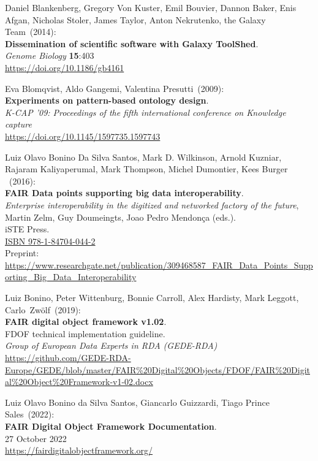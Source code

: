 \begin{thebibliography}{9}
Daniel Blankenberg, Gregory Von Kuster, Emil Bouvier, Dannon
Baker, Enis Afgan, Nicholas Stoler, James Taylor, Anton Nekrutenko, the
Galaxy Team~(2014): \\
\textbf{Dissemination of scientific software with Galaxy ToolShed}.\\
\emph{Genome Biology} \textbf{15}:403\\
\url{https://doi.org/10.1186/gb4161}

Eva Blomqvist, Aldo Gangemi, Valentina Presutti~(2009): \\
\textbf{Experiments on pattern-based ontology design}.\\
\emph{K-CAP '09: Proceedings of the fifth international conference on Knowledge capture}\\
\url{https://doi.org/10.1145/1597735.1597743}

Luiz Olavo Bonino Da Silva Santos, Mark D. Wilkinson, Arnold Kuzniar,
Rajaram Kaliyaperumal, Mark Thompson, Michel Dumontier, Kees Burger
~(2016): \\
\textbf{FAIR Data points supporting big data interoperability}. \\
\emph{Enterprise interoperability in the digitized and networked factory of the future}, Martin Zelm, Guy Doumeingts, Joao Pedro Mendonça (eds.).\\
iSTE Press. \\
\href{http://www.iste.co.uk/book.php?id=1073}{ISBN 978-1-84704-044-2} \\
Preprint: \url{https://www.researchgate.net/publication/309468587_FAIR_Data_Points_Supporting_Big_Data_Interoperability}

Luiz Bonino, Peter Wittenburg, Bonnie Carroll, Alex
Hardisty, Mark Leggott, Carlo~Zwölf~(2019): \\
\textbf{FAIR digital object framework v1.02}.\\
FDOF technical implementation guideline.\\
\emph{Group of European Data Experts in RDA (GEDE-RDA)}\\
\url{https://github.com/GEDE-RDA-Europe/GEDE/blob/master/FAIR\%20Digital\%20Objects/FDOF/FAIR\%20Digital\%20Object\%20Framework-v1-02.docx}

Luiz Olavo Bonino da Silva Santos, Giancarlo Guizzardi, Tiago Prince Sales~(2022): \\
\textbf{FAIR Digital Object Framework Documentation}. \\
27 October 2022\\
\url{https://fairdigitalobjectframework.org/}


\end{thebibliography}
